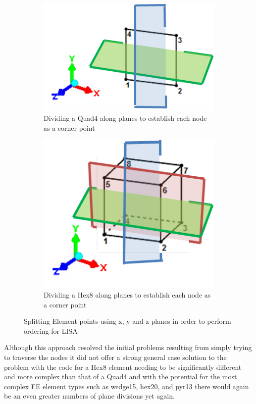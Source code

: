 \begin{figure}[!h]
\centering
\begin{subfigure}{.5\textwidth}
  \centering
  \includegraphics[width=0.9\linewidth]{../Graphics/SortingQuad4.png}
  \caption{Dividing a Quad4 along planes to establish each node as a corner point}
  \label{fig:sub1}
\end{subfigure}%
\begin{subfigure}{.5\textwidth}
  \centering
  \includegraphics[width=0.7\linewidth]{../Graphics/SortingHex8.png}
  \caption{Dividing a Hex8 along planes to establish each node as a corner point}
  \label{fig:sub2}
\end{subfigure}
\caption{Splitting Element points using x, y and z planes in order to perform ordering for LISA}
\label{fig:test}
\end{figure}

\noindent
Although this approach resolved the initial problems resulting from simply trying to traverse the nodes it did not offer a strong general case solution to the problem with the code for a Hex8 element needing to be significantly different and more complex than that of a Quad4 and with the potential for the most complex FE element types such as wedge15, hex20, and pyr13 there would again be an even greater numbers of plane divisions yet again.

